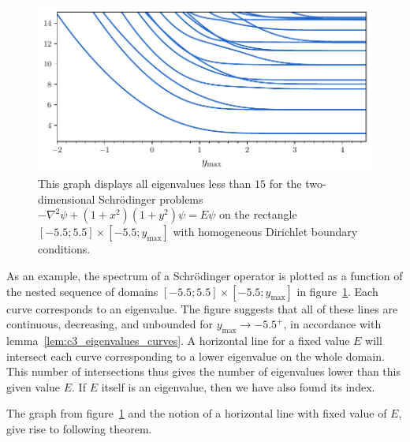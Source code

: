 \begin{figure}
  \begin{center}
    \includegraphics[width=\textwidth]{img/chapter3/counting/counting_eigenvalues.pdf}
    \caption{This graph displays all eigenvalues less than $15$ for the two-dimensional Schrödinger problems $-\nabla^2 \psi + (1+x^2)(1+y^2)\psi = E \psi$ on the rectangle $[-5.5; 5.5]\times[-5.5; y_{\text{max}}]$ with homogeneous Dirichlet boundary conditions.}\label{fig:c3_counting_eigenvalue_graph}
  \end{center}
\end{figure}

As an example, the spectrum of a Schrödinger operator is plotted as a function of the nested sequence of domains $[-5.5; 5.5] \times [-5.5; y_{\text{max}}]$ in figure~\ref{fig:c3_counting_eigenvalue_graph}. Each curve corresponds to an eigenvalue. The figure suggests that all of these lines are continuous, decreasing, and unbounded for $y_{\text{max}} \to -5.5^{+}$, in accordance with lemma~\ref{lem:c3_eigenvalues_curves}. A horizontal line for a fixed value $E$ will intersect each curve corresponding to a lower eigenvalue on the whole domain. This number of
intersections thus gives the number of eigenvalues lower than this given value $E$. If $E$ itself is an eigenvalue, then we have also found its index.

The graph from figure~\ref{fig:c3_counting_eigenvalue_graph} and the notion of a horizontal line with fixed value of $E$, give rise to following theorem.

